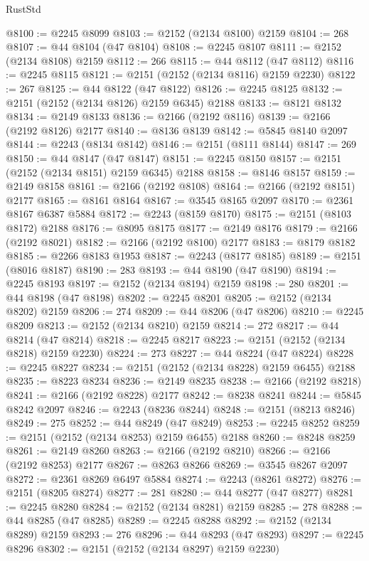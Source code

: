 \begin{lexlean}{RustStd}
\begin{coremodule}
@8100 := @2245 @8099
@8103 := @2152 (@2134 @8100) @2159
@8104 := 268
@8107 := @44 @8104 (@47 @8104)
@8108 := @2245 @8107
@8111 := @2152 (@2134 @8108) @2159
@8112 := 266
@8115 := @44 @8112 (@47 @8112)
@8116 := @2245 @8115
@8121 := @2151 (@2152 (@2134 @8116) @2159 @2230)
@8122 := 267
@8125 := @44 @8122 (@47 @8122)
@8126 := @2245 @8125
@8132 := @2151 (@2152 (@2134 @8126) @2159 @6345) @2188
@8133 := @8121 @8132
@8134 := @2149 @8133
@8136 := @2166 (@2192 @8116)
@8139 := @2166 (@2192 @8126) @2177
@8140 := @8136 @8139
@8142 := @5845 @8140 @2097
@8144 := @2243 (@8134 @8142)
@8146 := @2151 (@8111 @8144)
@8147 := 269
@8150 := @44 @8147 (@47 @8147)
@8151 := @2245 @8150
@8157 := @2151 (@2152 (@2134 @8151) @2159 @6345) @2188
@8158 := @8146 @8157
@8159 := @2149 @8158
@8161 := @2166 (@2192 @8108)
@8164 := @2166 (@2192 @8151) @2177
@8165 := @8161 @8164
@8167 := @3545 @8165 @2097
@8170 := @2361 @8167 @6387 @5884
@8172 := @2243 (@8159 @8170)
@8175 := @2151 (@8103 @8172) @2188
@8176 := @8095 @8175
@8177 := @2149 @8176
@8179 := @2166 (@2192 @8021)
@8182 := @2166 (@2192 @8100) @2177
@8183 := @8179 @8182
@8185 := @2266 @8183 @1953
@8187 := @2243 (@8177 @8185)
@8189 := @2151 (@8016 @8187)
@8190 := 283
@8193 := @44 @8190 (@47 @8190)
@8194 := @2245 @8193
@8197 := @2152 (@2134 @8194) @2159
@8198 := 280
@8201 := @44 @8198 (@47 @8198)
@8202 := @2245 @8201
@8205 := @2152 (@2134 @8202) @2159
@8206 := 274
@8209 := @44 @8206 (@47 @8206)
@8210 := @2245 @8209
@8213 := @2152 (@2134 @8210) @2159
@8214 := 272
@8217 := @44 @8214 (@47 @8214)
@8218 := @2245 @8217
@8223 := @2151 (@2152 (@2134 @8218) @2159 @2230)
@8224 := 273
@8227 := @44 @8224 (@47 @8224)
@8228 := @2245 @8227
@8234 := @2151 (@2152 (@2134 @8228) @2159 @6455) @2188
@8235 := @8223 @8234
@8236 := @2149 @8235
@8238 := @2166 (@2192 @8218)
@8241 := @2166 (@2192 @8228) @2177
@8242 := @8238 @8241
@8244 := @5845 @8242 @2097
@8246 := @2243 (@8236 @8244)
@8248 := @2151 (@8213 @8246)
@8249 := 275
@8252 := @44 @8249 (@47 @8249)
@8253 := @2245 @8252
@8259 := @2151 (@2152 (@2134 @8253) @2159 @6455) @2188
@8260 := @8248 @8259
@8261 := @2149 @8260
@8263 := @2166 (@2192 @8210)
@8266 := @2166 (@2192 @8253) @2177
@8267 := @8263 @8266
@8269 := @3545 @8267 @2097
@8272 := @2361 @8269 @6497 @5884
@8274 := @2243 (@8261 @8272)
@8276 := @2151 (@8205 @8274)
@8277 := 281
@8280 := @44 @8277 (@47 @8277)
@8281 := @2245 @8280
@8284 := @2152 (@2134 @8281) @2159
@8285 := 278
@8288 := @44 @8285 (@47 @8285)
@8289 := @2245 @8288
@8292 := @2152 (@2134 @8289) @2159
@8293 := 276
@8296 := @44 @8293 (@47 @8293)
@8297 := @2245 @8296
@8302 := @2151 (@2152 (@2134 @8297) @2159 @2230)

\end{coremodule}
\end{lexlean}
